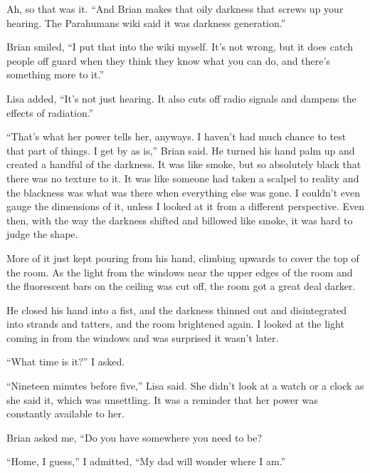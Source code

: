 Ah, so that was it.  ``And Brian makes that oily darkness that screws up your hearing.  The Parahumans wiki said it was darkness generation.''



Brian smiled, ``I put that into the wiki myself.  It's not wrong, but it does catch people off guard when they think they know what you can do, and there's something more to it.''



Lisa added, ``It's not just hearing.  It also cuts off radio signals and dampens the effects of radiation.''



``That's what her power tells her, anyways.  I haven't had much chance to test that part of things.  I get by as is,'' Brian said.  He turned his hand palm up and created a handful of the darkness.  It was like smoke, but so absolutely black that there was no texture to it.  It was like someone had taken a scalpel to reality and the blackness was what was there when everything else was gone.  I couldn't even gauge the dimensions of it, unless I looked at it from a different perspective.  Even then, with the way the darkness shifted and billowed like smoke, it was hard to judge the shape.



More of it just kept pouring from his hand, climbing upwards to cover the top of the room.  As the light from the windows near the upper edges of the room and the fluorescent bars on the ceiling was cut off, the room got a great deal darker.



He closed his hand into a fist, and the darkness thinned out and disintegrated into strands and tatters, and the room brightened again.  I looked at the light coming in from the windows and was surprised it wasn't later.



``What time is it?''  I asked.



``Nineteen minutes before five,'' Lisa said.  She didn't look at a watch or a clock as she said it, which was unsettling.  It was a reminder that her power was constantly available to her.



Brian asked me, ``Do you have somewhere you need to be?



``Home, I guess,'' I admitted, ``My dad will wonder where I am.''



